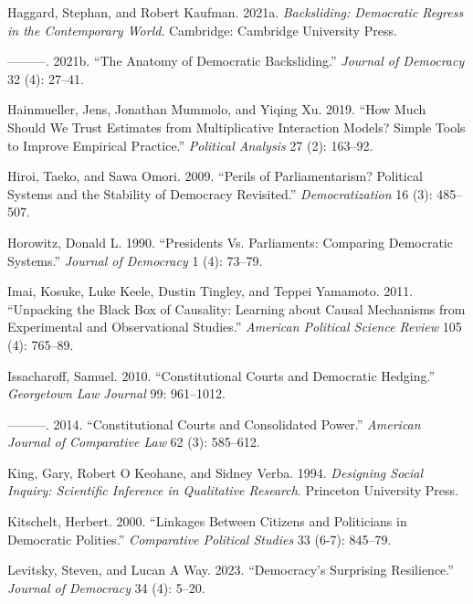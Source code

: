 \documentclass[
  letterpaper,
  DIV=11,
  numbers=noendperiod]{scrartcl}
\newlength{\cslhangindent}
\newenvironment{CSLReferences}[2] %
 {\begin{list}{}{%
  \setlength{\itemindent}{0pt}
  \setlength{\leftmargin}{0pt}
  \setlength{\parsep}{0pt}
  \ifodd #1
   \setlength{\leftmargin}{\cslhangindent}
   \setlength{\itemindent}{-1\cslhangindent}
  \fi
  \setlength{\itemsep}{#2\baselineskip}}}
 {\end{list}}
\begin{document}
\begin{CSLReferences}{1}{0}
Haggard, Stephan, and Robert Kaufman. 2021a. \emph{Backsliding:
Democratic Regress in the Contemporary World}. Cambridge: Cambridge
University Press.

---------. 2021b. {``The Anatomy of Democratic Backsliding.''}
\emph{Journal of Democracy} 32 (4): 27--41.

Hainmueller, Jens, Jonathan Mummolo, and Yiqing Xu. 2019. {``How Much
Should We Trust Estimates from Multiplicative Interaction Models? Simple
Tools to Improve Empirical Practice.''} \emph{Political Analysis} 27
(2): 163--92.

Hiroi, Taeko, and Sawa Omori. 2009. {``Perils of Parliamentarism?
Political Systems and the Stability of Democracy Revisited.''}
\emph{Democratization} 16 (3): 485--507.

Horowitz, Donald L. 1990. {``Presidents Vs. Parliaments: Comparing
Democratic Systems.''} \emph{Journal of Democracy} 1 (4): 73--79.

Imai, Kosuke, Luke Keele, Dustin Tingley, and Teppei Yamamoto. 2011.
{``Unpacking the Black Box of Causality: Learning about Causal
Mechanisms from Experimental and Observational Studies.''}
\emph{American Political Science Review} 105 (4): 765--89.

Issacharoff, Samuel. 2010. {``Constitutional Courts and Democratic
Hedging.''} \emph{Georgetown Law Journal} 99: 961--1012.

---------. 2014. {``Constitutional Courts and Consolidated Power.''}
\emph{American Journal of Comparative Law} 62 (3): 585--612.

King, Gary, Robert O Keohane, and Sidney Verba. 1994. \emph{Designing
Social Inquiry: Scientific Inference in Qualitative Research}. Princeton
University Press.

Kitschelt, Herbert. 2000. {``Linkages Between Citizens and Politicians
in Democratic Polities.''} \emph{Comparative Political Studies} 33
(6-7): 845--79.

Levitsky, Steven, and Lucan A Way. 2023. {``Democracy's Surprising
Resilience.''} \emph{Journal of Democracy} 34 (4): 5--20.


\end{CSLReferences}
\end{document}
